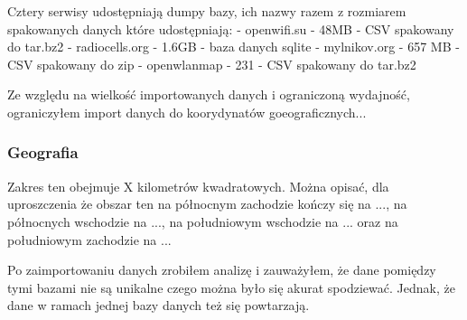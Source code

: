 Cztery serwisy udostępniają dumpy bazy, ich nazwy razem z rozmiarem spakowanych danych które udostępniają:
 - openwifi.su - 48MB - CSV spakowany do tar.bz2
 - radiocells.org - 1.6GB - baza danych sqlite
 - mylnikov.org - 657 MB - CSV spakowany do zip
 - openwlanmap - 231 - CSV spakowany do tar.bz2

Ze względu na wielkość importowanych danych i ograniczoną wydajność, ograniczyłem import danych do koorydynatów goeograficznych... 
\subsubsection{Geografia}
Zakres ten obejmuje X kilometrów kwadratowych. Można opisać, dla uproszczenia że obszar ten na północnym zachodzie kończy się na ..., na północnych wschodzie na ..., na południowym wschodzie na ... oraz na południowym zachodzie na ...



Po zaimportowaniu danych zrobiłem analizę i zauważyłem, że dane pomiędzy tymi bazami nie są unikalne czego można było się akurat spodziewać. Jednak, że dane w ramach jednej bazy danych też się powtarzają.



